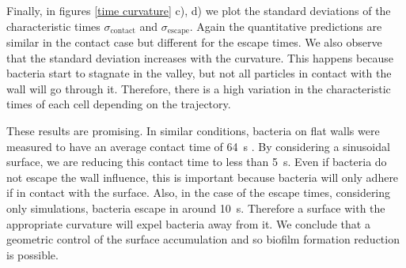 Finally, in figures \ref{time curvature} c), d) we plot the standard deviations of the characteristic times $\sigma_{\text{contact}}$ and $\sigma_{\text{escape}}$. Again the quantitative predictions are similar in the contact case but different for the escape times. We also observe that the standard deviation increases with the curvature. This happens because bacteria start to stagnate in the valley, but not all particles in contact with the wall will go through it. Therefore, there is a high variation in the characteristic times of each cell depending on the trajectory.

These results are promising. In similar conditions, bacteria on flat walls were measured to have an average contact time of \SI{64}{\second} \cite{Drescher2011FluidScattering}. By considering a sinusoidal surface, we are reducing this contact time to less than \SI{5}{\second}. Even if bacteria do not escape the wall influence, this is important because bacteria will only adhere if in contact with the surface. Also, in the case of the escape times, considering only simulations, bacteria escape in around \SI{10}{\second}. Therefore a surface with the appropriate curvature will expel bacteria away from it. We conclude that a geometric control of the surface accumulation and so biofilm formation reduction is possible.
 

